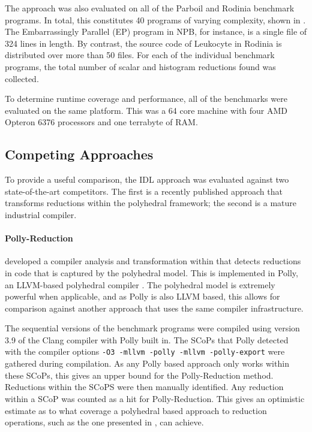     The approach was also evaluated on all of the Parboil \citep{Stratton2018}
    and Rodinia \citep{Che2009Rodinia} benchmark programs.
    In total, this constitutes 40 programs of varying complexity, shown in
    .
    The Embarrassingly Parallel (EP) program in NPB, for instance, is a single
    file of 324 lines in length.
    By contrast, the source code of Leukocyte in Rodinia is distributed over
    more than 50 files.
    For each of the individual benchmark programs, the total number of scalar
    and histogram reductions found was collected.

    To determine runtime coverage and performance, all of the benchmarks were
    evaluated on the same platform.
    This was a 64 core machine with four AMD Opteron 6376 processors and one
    terrabyte of RAM.

\subsection{Competing Approaches}

    To provide a useful comparison, the IDL approach was evaluated against two
    state-of-the-art competitors.
    The first is a recently published approach that transforms reductions within
    the polyhedral framework; the second is a mature industrial compiler.

\paragraph*{Polly-Reduction}

    \citet{Doerfert2015Polly} developed a compiler analysis and transformation
    within that detects reductions in code that is captured by the
    polyhedral model.
    This is implemented in Polly, an LLVM-based polyhedral compiler
    \citep{Lengauer2012Polly}.
    The polyhedral model is extremely powerful when applicable, and as Polly is
    also LLVM based, this allows for comparison against another approach that
    uses the same compiler infrastructure.

    The sequential versions of the benchmark programs were compiled using
    version 3.9 of the Clang compiler with Polly built in.
    The SCoPs that Polly detected with the compiler options \texttt{-O3
    -mllvm -polly -mllvm -polly-export} were gathered during compilation.
    As any Polly based approach only works within these SCoPs, this gives an
    upper bound for the Polly-Reduction method.
    Reductions within the SCoPS were then manually identified.
    Any reduction within a SCoP was counted as a hit for Polly-Reduction.
    This gives an optimistic estimate as to what coverage a polyhedral based
    approach to reduction operations, such as the one presented in
    \citet{Doerfert2015Polly}, can achieve.

